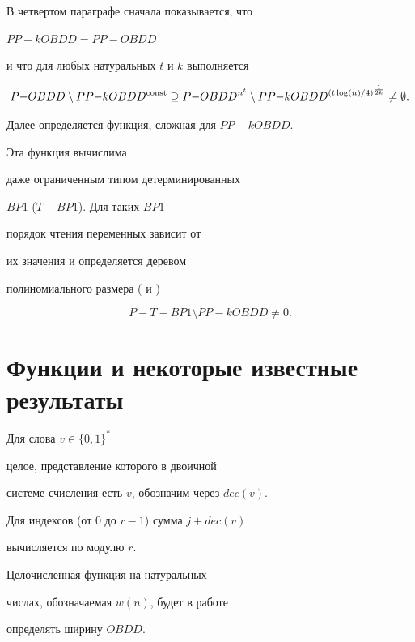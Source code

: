 В четвертом параграфе сначала показывается, что


$PP{-}kOBDD=PP{-}OBDD$


и что для любых натуральных $t$ и $k$ выполняется


$$


P{-}OBDD\setminus PP{-}kOBDD^{\const}\supseteq


P{-}OBDD^{n^t}\setminus


PP{-}kOBDD^{(t\log(n)/4)^{\frac{1}{2k}}}\ne\emptyset.


$$





Далее определяется функция, сложная для $PP{-}kOBDD$.


Эта функция вычислима


даже ограниченным типом детерминированных


$BP1$ ($T{-}BP1$). Для таких $BP1$


порядок чтения переменных зависит от


их значения и определяется деревом


полиномиального размера (\cite{GM94} и \cite{SW95})


$$


P{-}T{-}BP1\setminus PP{-}kOBDD\ne0.


$$








\section{Функции и некоторые известные результаты}





Для слова $v\in\{0,1\}^*$


целое, представление которого в двоичной


системе счисления есть $v$, обозначим через $dec(v)$.


Для индексов (от $0$ до $r-1$) сумма $j+dec(v)$


вычисляется по модулю $r$.





Целочисленная функция на натуральных


числах, обозначаемая $w(n)$, будет в работе


определять ширину $OBDD$.





